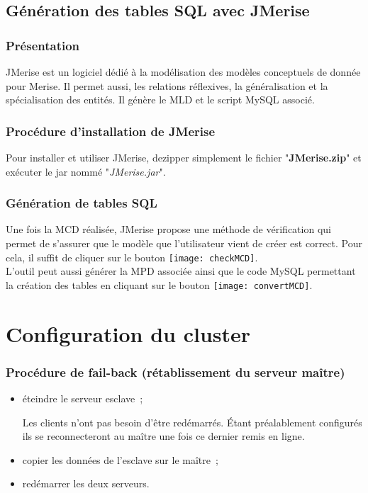  \subsection{Génération des tables SQL avec JMerise}
 
 \subsubsection{Présentation}
JMerise est un logiciel dédié à la modélisation des modèles conceptuels de donnée pour Merise. Il permet aussi, les relations réflexives, la généralisation et la spécialisation des entités. Il génère le MLD et le script MySQL associé.

 \subsubsection{Procédure d'installation de JMerise}
Pour installer et utiliser JMerise, dezipper simplement le fichier "\textbf{JMerise.zip}" et exécuter le jar nommé "\textit{JMerise.jar}". 

 \subsubsection{Génération de tables SQL}
Une fois la MCD réalisée, JMerise propose une méthode de vérification qui permet de s'assurer que le modèle que l'utilisateur vient de créer est correct. Pour cela, il suffit de cliquer sur le bouton \texttt{[image: checkMCD]}.\\
L'outil peut aussi générer la MPD associée ainsi que le code MySQL permettant la création des tables en cliquant sur le bouton \texttt{[image: convertMCD]}.

\section{Configuration du cluster}

\subsubsection{Procédure de fail-back (rétablissement du serveur maître)}
\begin{itemize}
	\item éteindre le serveur esclave~;
	\begin{notation}
		Les clients n'ont pas besoin d'être redémarrés.
		Étant préalablement configurés ils se reconnecteront au maître une fois ce dernier remis en ligne.
	\end{notation}
	\item copier les données de l'esclave sur le maître~;
	\item redémarrer les deux serveurs.
\end{itemize}
